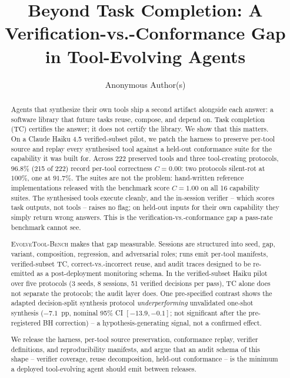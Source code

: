 \documentclass[sigconf,anonymous,review,natbib=false]{acmart}
\begin{document}
\title{Beyond Task Completion: A Verification-vs.-Conformance Gap in Tool-Evolving Agents}

\author{Anonymous Author(s)}

\begin{abstract}
Agents that synthesize their own tools ship a second artifact alongside each answer: a software library that future tasks reuse, compose, and depend on. Task completion (TC) certifies the answer; it does not certify the library. We show that this matters. On a Claude Haiku 4.5 verified-subset pilot, we patch the harness to preserve per-tool source and replay every synthesised tool against a held-out conformance suite for the capability it was built for. Across 222 preserved tools and three tool-creating protocols, $96.8\%$ (215 of 222) record per-tool correctness $C{=}0.00$: two protocols silent-rot at $100\%$, one at $91.7\%$. The suites are not the problem: hand-written reference implementations released with the benchmark score $C{=}1.00$ on all 16 capability suites. The synthesised tools execute cleanly, and the in-session verifier -- which scores task outputs, not tools -- raises no flag; on held-out inputs for their own capability they simply return wrong answers. This is the verification-vs.-conformance gap a pass-rate benchmark cannot see.

\textsc{EvolveTool-Bench} makes that gap measurable. Sessions are structured into seed, gap, variant, composition, regression, and adversarial roles; runs emit per-tool manifests, verified-subset TC, correct-vs.-incorrect reuse, and audit traces designed to be re-emitted as a post-deployment monitoring schema. In the verified-subset Haiku pilot over five protocols (3 seeds, 8 sessions, 51 verified decisions per pass), TC alone does not separate the protocols; the audit layer does. One pre-specified contrast shows the adapted decision-split synthesis protocol \emph{underperforming} unvalidated one-shot synthesis ($-7.1$~pp, nominal 95\% CI $[-13.9,-0.1]$; not significant after the pre-registered BH correction) -- a hypothesis-generating signal, not a confirmed effect.

We release the harness, per-tool source preservation, conformance replay, verifier definitions, and reproducibility manifests, and argue that an audit schema of this shape -- verifier coverage, reuse decomposition, held-out conformance -- is the minimum a deployed tool-evolving agent should emit between releases.
\end{abstract}
\end{document}
